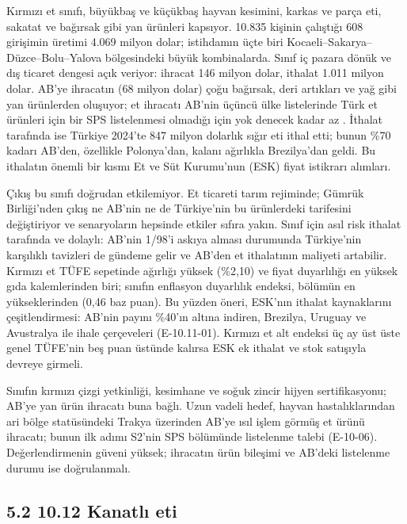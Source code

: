 Kırmızı et sınıfı, büyükbaş ve küçükbaş hayvan kesimini, karkas ve parça eti, sakatat ve bağırsak gibi yan ürünleri kapsıyor. 10.835 kişinin çalıştığı 608 girişimin üretimi 4.069 milyon dolar; istihdamın üçte biri Kocaeli--Sakarya--Düzce--Bolu--Yalova bölgesindeki büyük kombinalarda. Sınıf iç pazara dönük ve dış ticaret dengesi açık veriyor: ihracat 146 milyon dolar, ithalat 1.011 milyon dolar. AB'ye ihracatın (68 milyon dolar) çoğu bağırsak, deri artıkları ve yağ gibi yan ürünlerden oluşuyor; et ihracatı AB'nin üçüncü ülke listelerinde Türk et ürünleri için bir SPS listelenmesi olmadığı için yok denecek kadar az \etiketD{}. İthalat tarafında ise Türkiye 2024'te 847 milyon dolarlık sığır eti ithal etti; bunun \%70 kadarı AB'den, özellikle Polonya'dan, kalanı ağırlıkla Brezilya'dan geldi. Bu ithalatın önemli bir kısmı Et ve Süt Kurumu'nun (ESK) fiyat istikrarı alımları.

Çıkış bu sınıfı doğrudan etkilemiyor. Et ticareti tarım rejiminde; Gümrük Birliği'nden çıkış ne AB'nin ne de Türkiye'nin bu ürünlerdeki tarifesini değiştiriyor ve senaryoların hepsinde etkiler sıfıra yakın. Sınıf için asıl risk ithalat tarafında ve dolaylı: AB'nin 1/98'i askıya alması durumunda Türkiye'nin karşılıklı tavizleri de gündeme gelir ve AB'den et ithalatının maliyeti artabilir. Kırmızı et TÜFE sepetinde ağırlığı yüksek (\%2,10) ve fiyat duyarlılığı en yüksek gıda kalemlerinden biri; sınıfın enflasyon duyarlılık endeksi, bölümün en yükseklerinden (0,46 baz puan). Bu yüzden öneri, ESK'nın ithalat kaynaklarını çeşitlendirmesi: AB'nin payını \%40'ın altına indiren, Brezilya, Uruguay ve Avustralya ile ihale çerçeveleri (E-10.11-01). Kırmızı et alt endeksi üç ay üst üste genel TÜFE'nin beş puan üstünde kalırsa ESK ek ithalat ve stok satışıyla devreye girmeli.

Sınıfın kırmızı çizgi yetkinliği, kesimhane ve soğuk zincir hijyen sertifikasyonu; AB'ye yan ürün ihracatı buna bağlı. Uzun vadeli hedef, hayvan hastalıklarından ari bölge statüsündeki Trakya üzerinden AB'ye ısıl işlem görmüş et ürünü ihracatı; bunun ilk adımı S2'nin SPS bölümünde listelenme talebi (E-10-06). Değerlendirmenin güveni yüksek; ihracatın ürün bileşimi ve AB'deki listelenme durumu ise doğrulanmalı.

\hypertarget{nace_kartlar_10-12-52-1012-kanatlux131-eti}{%
\subsection{5.2 10.12 Kanatlı eti}\label{nace_kartlar_10-12-52-1012-kanatlux131-eti}}

